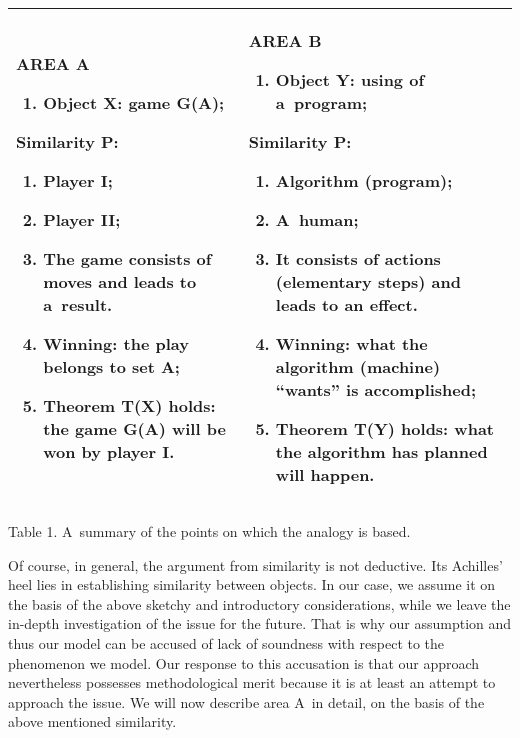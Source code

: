 \begin{flushleft}




\begin{supertabular}{|m{7.2330003cm}|m{7.118cm}|}
\hline
AREA A

\begin{enumerate}
\item Object X: game G(A);
\end{enumerate}
Similarity P:

\begin{enumerate}
\item Player \textbf{I};
\item Player \textbf{II};
\item The game consists of moves and leads to a~result.
\item Winning: the play belongs to set A;
\item Theorem T(X) holds: the game G(A) will be won by player \textbf{I}.
\end{enumerate}
&
AREA B

\begin{enumerate}
\item Object Y: using of a~program;
\end{enumerate}
Similarity P:

\begin{enumerate}
\item Algorithm (program);
\item A~human;
\item It consists of actions (elementary steps) and leads to an effect.
\item Winning: what the algorithm (machine) ``wants'' is accomplished;
\item Theorem T(Y) holds: what the algorithm has planned will happen.
\end{enumerate}
\\\hline
\end{supertabular}
\end{flushleft}
Table 1. A~summary of the points on which the analogy is based.

Of course, in general, the argument from similarity is not deductive. Its Achilles' heel lies in establishing similarity between objects. In our case, we assume it on the basis of the above sketchy and introductory considerations, while we leave the in-depth investigation of the issue for the future. That is why our assumption and thus our model can be accused of lack of soundness with respect to the phenomenon we model. Our response to this accusation is that our approach nevertheless possesses methodological merit because it is at least an attempt to approach the issue. We will now describe area A~in detail, on the basis of the above mentioned similarity.

